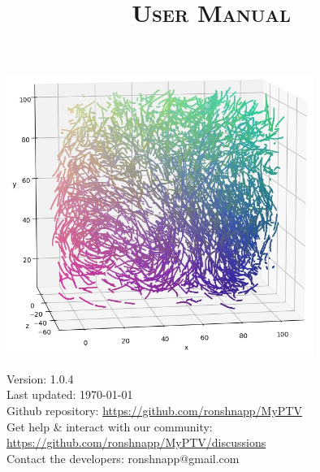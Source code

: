 \documentclass[10pt,a4paper]{article}
\title{\Huge \sffamily \textsc{\textbf{User Manual}}}
\author{}%
\date{}
\begin{document}
	
	


	
\maketitle

\thispagestyle{empty}
\vspace{2.5cm}

\begin{center}
	\includegraphics[width=10cm]{traj_image.jpg}
\end{center}

\vfill

\begin{minipage}{14cm}
	{\small \sffamily
	Version: 1.0.4 \\
	Last updated: \today \\
	Github repository: \url{https://github.com/ronshnapp/MyPTV} \\
	Get help \& interact with our community: \url{https://github.com/ronshnapp/MyPTV/discussions}\\
	Contact the developers: ronshnapp@gmail.com}
\end{minipage}



\newpage
\tableofcontents
{}
\newpage









\end{document}
